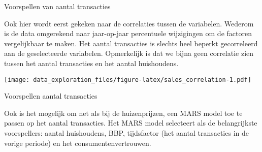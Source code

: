 \documentclass[
]{article}
\newenvironment{Shaded}{\begin{snugshade}}{\end{snugshade}}
\newcommand{\DataTypeTok}[1]{\textcolor[rgb]{0.13,0.29,0.53}{#1}}
\newcommand{\DecValTok}[1]{\textcolor[rgb]{0.00,0.00,0.81}{#1}}
\newcommand{\FloatTok}[1]{\textcolor[rgb]{0.00,0.00,0.81}{#1}}
\newcommand{\KeywordTok}[1]{\textcolor[rgb]{0.13,0.29,0.53}{\textbf{#1}}}
\newcommand{\NormalTok}[1]{#1}
\newcommand{\OperatorTok}[1]{\textcolor[rgb]{0.81,0.36,0.00}{\textbf{#1}}}
\newcommand{\StringTok}[1]{\textcolor[rgb]{0.31,0.60,0.02}{#1}}
\begin{document}
Voorspellen van aantal transacties

Ook hier wordt eerst gekeken naar de correlaties tussen de variabelen.
Wederom is de data omgerekend naar jaar-op-jaar percentuele wijzigingen
om de factoren vergelijkbaar te maken. Het aantal transacties is slechts
heel beperkt gecorreleerd aan de geselecteerde variabelen. Opmerkelijk
is dat we bijna geen correlatie zien tussen het aantal transacties en
het aantal huishoudens.

\begin{Shaded}
\end{Shaded}

\texttt{[image: data\_exploration\_files/figure-latex/sales\_correlation-1.pdf]}

Voorspellen aantal transacties

Ook is het mogelijk om net als bij de huizenprijzen, een MARS model toe
te passen op het aantal transacties. Het MARS model selecteert als de
belangrijkste voorspellers: aantal huishoudens, BBP, tijdsfactor (het
aantal transacties in de vorige periode) en het consumentenvertrouwen.
\end{document}
